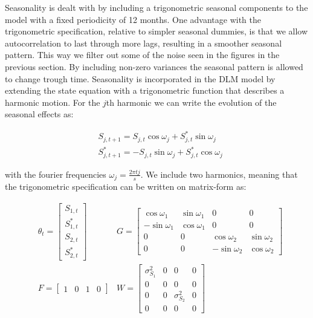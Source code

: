 \documentclass[12pt, a4paper]{article}
\begin{document}
Seasonality is dealt with by including a trigonometric seasonal
components to the model with a fixed periodicity of 12 months. One
advantage with the trigonometric specification, relative to simpler
seasonal dummies, is that we allow autocorrelation to last through more
lags, resulting in a smoother seasonal pattern. This way we filter out
some of the noise seen in the figures in the previous section. By
including non-zero variances the seasonal pattern is allowed to change
trough time. Seasonality is incorporated in the DLM model by extending
the state equation with a trigonometric function that describes a harmonic motion. For the $j$th harmonic we can write the evolution of the seasonal effects as:


\begin{align}
&S_{j, t+1} = S_{j, t} \cos \omega_{j} + S_{j, t}^{*} \sin \omega_{j} \\ 
&S_{j, t+1}^{*} = - S_{j, t} \sin \omega_{j} + S_{j, t}^{*} \cos \omega_{j}
\end{align}

with the fourier frequencies $\omega_{j} = \frac{2 \pi t j}{s}$. We include two harmonics, meaning that the trigonometric specification can be written on
matrix-form as:

\begin{align*}
   & \theta_{t} = \begin{bmatrix}
    S_{1, t} \\ S_{1, t}^{*} \\ S_{2, t} \\ S_{2, t}^{*}
  \end{bmatrix}
   & G = \begin{bmatrix}
    \cos \omega_{1} & \sin \omega_{1} & 0 & 0 \\ 
    -\sin \omega_{1} & \cos \omega_{1} & 0 & 0 \\
    0 & 0 & \cos \omega_{2} & \sin \omega_{2} \\
    0 & 0 & -\sin \omega_{2} & \cos \omega_{2}
  \end{bmatrix}
   \\
    & F = \begin{bmatrix} 1 & 0 & 1 & 0 \end{bmatrix}   
   & W = \begin{bmatrix}
     \sigma_{S_{1}}^{2} & 0 & 0 & 0 \\
     0 & 0 & 0 & 0 \\
     0 & 0 & \sigma_{S_{2}}^{2} & 0  \\
     0 & 0 & 0 & 0
   \end{bmatrix}
\end{align*}
\end{document}
